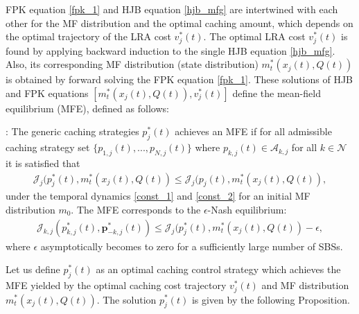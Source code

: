 \documentclass{book}
\begin{document}
    { FPK equation \eqref{fpk_1} and HJB equation \eqref{hjb_mfg} are intertwined with each other for the MF distribution and the optimal caching amount, which depends on the optimal trajectory of the LRA cost $v_j^*(t)$.
    The optimal LRA cost  $v^*_{j}(t)$ is found by applying backward induction to the single HJB equation \eqref{hjb_mfg}. Also, its corresponding MF distribution (state distribution) $m_t^*(x_j(t),Q(t))$ is obtained by forward solving the FPK equation \eqref{fpk_1}. These solutions of HJB and FPK equations $[m_t^*(x_j(t),Q(t)), v_j^*(t)]$ define the mean-field equilibrium (MFE)}, defined as follows:
    
    \vskip 10pt
    : The generic caching strategies $p_{j}^*(t)$ achieves an  MFE if for all admissible caching strategy set $\{p_{1,j}(t),...,p_{N,j}(t) \} $ where $p_{k,j}(t) \in  \mathcal{A}_{k,j}$ for all $k \in \mathcal{N}$ it is satisfied that 
    \begin{align}
    \mathcal{J}_{j}(p_{j}^*(t), m^*_t(x_j(t),Q(t))\leq \mathcal{J}_{j}(p_{j}(t), m^*_t(x_j(t),Q(t)), \label{Def_NE}
    \end{align}
    under the temporal dynamics \eqref{const_1} and \eqref{const_2} for an initial MF distribution $m_0$.
    The MFE corresponds to the $\epsilon$-Nash equilibrium:
    \begin{align}
    \mathcal{J}_{k,j}(p_{k,j}^*(t), \boldsymbol{p}_{-k,j}^*(t))\leq \mathcal{J}_{j}(p_{j}^*(t), m^*_t(x_j(t),Q(t)) -\epsilon, 
    \end{align}
    where $\epsilon$ asymptotically becomes to zero for a sufficiently large number of SBSs.
    
    Let us define $p_j^*(t)$ as an optimal caching control strategy which achieves the MFE yielded by the optimal caching cost trajectory $v_j^*(t)$ and MF distribution $m_t^*(x_j(t),Q(t))$.
    The solution $p_j^*(t)$ is given by the following Proposition.
    
    
    
\end{document}
